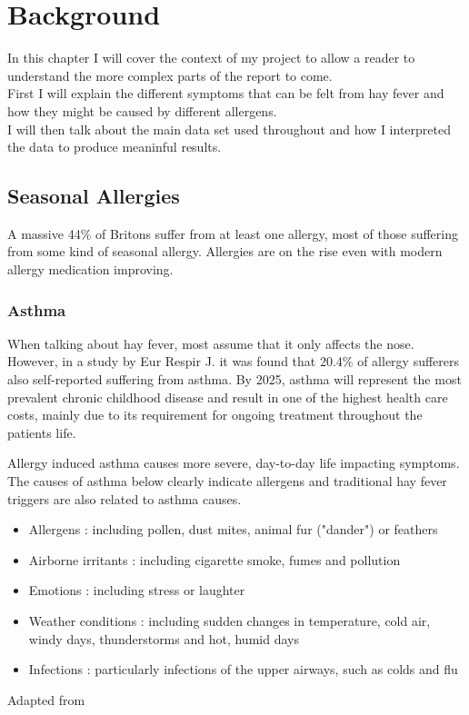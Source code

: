 \chapter{Background}
\label{cha:back}

In this chapter I will cover the context of my project to allow a reader to understand the more complex parts of the report to come.\\
First I will explain the different symptoms that can be felt from hay fever and how they might be caused by different allergens.\\
I will then talk about the main data set used throughout and how I interpreted the data to produce meaninful results.\\

\section{Seasonal Allergies}
A massive 44\% of Britons suffer from at least one allergy, most of those suffering from some kind of seasonal allergy. Allergies are on the rise even with modern allergy medication improving.
\cite{mintelallergy}

\subsection{Asthma}
When talking about hay fever, most assume that it only affects the nose. However, in a study by Eur Respir J. it was found that 20.4\% of allergy sufferers also self-reported suffering from asthma\cite{rhinitis}. By 2025, asthma will represent the most prevalent chronic childhood disease and result in one of the highest health care costs, mainly due to its requirement for ongoing treatment throughout the patients life.

Allergy induced asthma causes more severe, day-to-day life impacting symptoms. The causes of asthma below clearly indicate allergens and traditional hay fever triggers are also related to asthma causes.\\


\begin{itemize}
  \item Allergens : including pollen, dust mites, animal fur ("dander") or feathers
  \item Airborne irritants : including cigarette smoke, fumes and pollution
  \item Emotions : including stress or laughter
  \item Weather conditions : including sudden changes in temperature, cold air, windy days, thunderstorms and hot, humid days
  \item Infections : particularly infections of the upper airways, such as colds and flu
\end{itemize}Adapted from \cite{urlasthmacauses}

